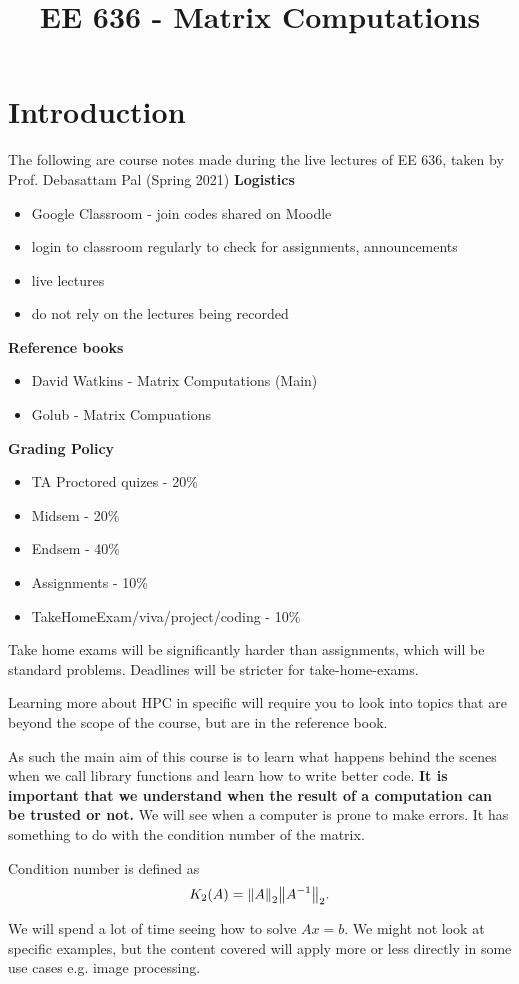 \documentclass[a4paper]{article}
\title{EE 636 - Matrix Computations}
\begin{document}
\section{Introduction}
The following are course notes made during the live lectures of
EE 636, taken by Prof. Debasattam Pal (Spring 2021)
\textbf{Logistics}
\begin{itemize}
	\item Google Classroom - join codes shared on Moodle
	\item login to classroom regularly to check for assignments, announcements
	\item live lectures
	\item do not rely on the lectures being recorded
\end{itemize}
\textbf{Reference books}
\begin{itemize}
	\item David Watkins - Matrix Computations (Main)
	\item Golub - Matrix Compuations
\end{itemize}
\textbf{Grading Policy}
\begin{itemize}
	\item TA Proctored quizes - 20\%
	\item Midsem - 20\%
	\item Endsem - 40\%
	\item Assignments - 10\%
	\item TakeHomeExam/viva/project/coding - 10\%
\end{itemize}

Take home exams will be significantly harder than assignments, which
will be standard problems. Deadlines will be stricter for take-home-exams.

Learning more about HPC in specific will require you to look into
topics that are beyond the scope of the course, but are in the
reference book.

As such the main aim of this course is to learn what happens behind
the scenes when we call library functions and learn how to write
better code. \textbf{It is important that we understand when the result
of a computation can be trusted or not.} We will see when a computer
is prone to make errors. It has something to do with the condition 
number of the matrix.

Condition number is defined as
\[
	K_2(A) = {\norm{A}_2}{\norm{A^{-1}}_2}
.\] 

We will spend a lot of time seeing how to solve $Ax = b$. We might
not look at specific examples, but the content covered will apply
more or less directly in some use cases e.g. image processing.
\end{document}
